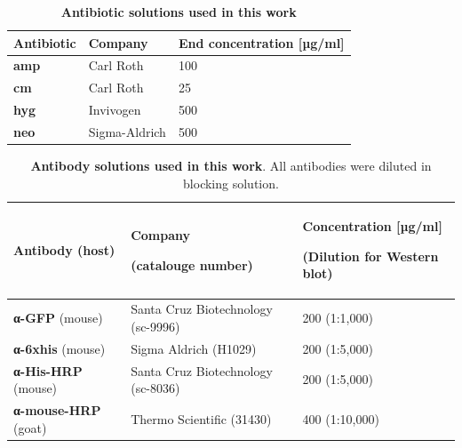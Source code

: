 \begin{table}[H]
        \caption{\textbf{Antibiotic solutions used in this work}}
        \label{tab:antibiotic_sol}
        \begin{tabular}{|Y{4.8cm}|Y{3cm}|Y{6cm}|}
            \hline
                \textbf{Antibiotic} &  \textbf{Company} & \textbf{End concentration [µg/ml]} \\ 
            \hline
                \textbf{\Gls{amp}} & Carl Roth  & 100 \\
                \textbf{\Gls{cm}} & Carl Roth  & 25 \\ 
                \textbf{\Gls{hyg}} & Invivogen  & 500  \\ 
                \textbf{\Gls{neo}} & Sigma-Aldrich & 500 \\
            \hline
        \end{tabular}
    \end{table}
\begin{table}[H]
        \caption{\textbf{Antibody solutions used in this work}. All antibodies were diluted in blocking solution.}
        \label{tab:antibody_list}
        \begin{tabular}{|Y{4.2cm}|Y{4.5 cm}|Y{5.2cm}|}
            \hline
                \textbf{Antibody} (host) 
                    &  \textbf{Company} \par \textbf{(catalouge number)} 
                    & \textbf{Concentration [µg/ml]} \par \textbf{(Dilution for Western blot)} \\ 
            \hline
                \textbf{\textgreek{α}-GFP} (mouse) & Santa Cruz Biotechnology (sc-9996) & 200 \quad (1:1,000) \\
                \textbf{\textgreek{α}-\gls{6xhis}} (mouse) & Sigma Aldrich (H1029) & 200 \quad (1:5,000) \\
                \textbf{\textgreek{α}-His-HRP} (mouse) & Santa Cruz Biotechnology (sc-8036) & 200 \quad (1:5,000) \\
                \textbf{\textgreek{α}-mouse-HRP} (goat) & Thermo Scientific (31430) & 400 \quad (1:10,000) \\
            \hline
        \end{tabular} 
    \end{table}
